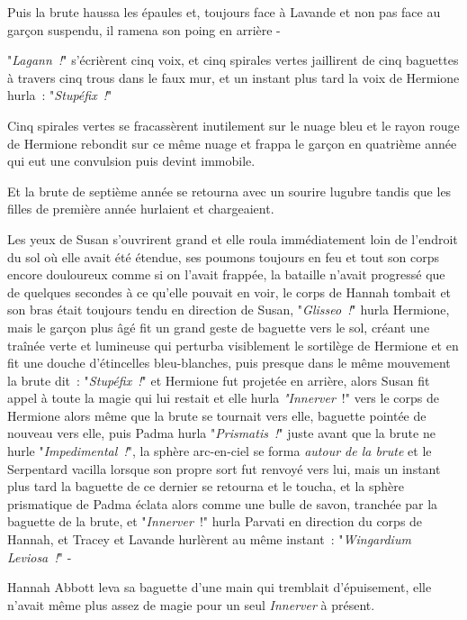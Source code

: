 Puis la brute haussa les épaules et, toujours face à Lavande et non pas face au garçon suspendu, il ramena son poing en arrière -

"\emph{Lagann~!}" s'écrièrent cinq voix, et cinq spirales vertes jaillirent de cinq baguettes à travers cinq trous dans le faux mur, et un instant plus tard la voix de Hermione hurla~: "\emph{Stupéfix~!}"

Cinq spirales vertes se fracassèrent inutilement sur le nuage bleu et le rayon rouge de Hermione rebondit sur ce même nuage et frappa le garçon en quatrième année qui eut une convulsion puis devint immobile.

Et la brute de septième année se retourna avec un sourire lugubre tandis que les filles de première année hurlaient et chargeaient.

\later

Les yeux de Susan s'ouvrirent grand et elle roula immédiatement loin de l'endroit du sol où elle avait été étendue, ses poumons toujours en feu et tout son corps encore douloureux comme si on l'avait frappée, la bataille n'avait progressé que de quelques secondes à ce qu'elle pouvait en voir, le corps de Hannah tombait et son bras était toujours tendu en direction de Susan, "\emph{Glisseo~!}" hurla Hermione, mais le garçon plus âgé fit un grand geste de baguette vers le sol, créant une traînée verte et lumineuse qui perturba visiblement le sortilège de Hermione et en fit une douche d'étincelles bleu-blanches, puis presque dans le même mouvement la brute dit~: "\emph{Stupéfix~!}" et Hermione fut projetée en arrière, alors Susan fit appel à toute la magie qui lui restait et elle hurla \emph{"Innerver}~!" vers le corps de Hermione alors même que la brute se tournait vers elle, baguette pointée de nouveau vers elle, puis Padma hurla "\emph{Prismatis~!}" juste avant que la brute ne hurle "\emph{Impedimental~!}", la sphère arc-en-ciel se forma \emph{autour de la brute} et le Serpentard vacilla lorsque son propre sort fut renvoyé vers lui, mais un instant plus tard la baguette de ce dernier se retourna et le toucha, et la sphère prismatique de Padma éclata alors comme une bulle de savon, tranchée par la baguette de la brute, et "\emph{Innerver}~!" hurla Parvati en direction du corps de Hannah, et Tracey et Lavande hurlèrent au même instant~: "\emph{Wingardium Leviosa~!}" -

\later

Hannah Abbott leva sa baguette d'une main qui tremblait d'épuisement, elle n'avait même plus assez de magie pour un seul \emph{Innerver} à présent.

